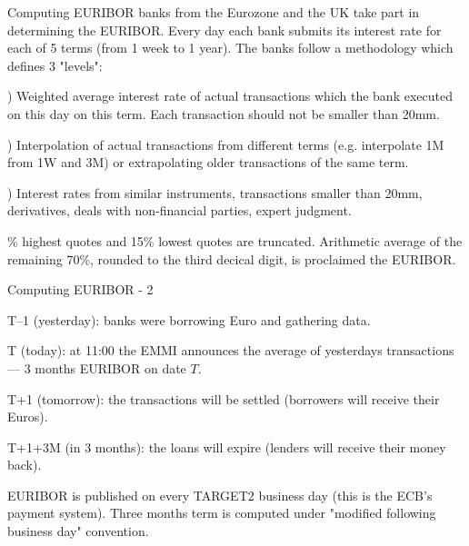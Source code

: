 \documentclass{beamer}
\begin{document}
\begin{frame}{Computing EURIBOR}
 banks from the Eurozone and the UK take part in determining the EURIBOR. Every day each bank submits its interest rate for each of 5 terms (from 1 week to 1 year). The banks follow a methodology which defines 3 "levels":

) Weighted average interest rate of actual transactions which the bank executed on this day on this term. Each transaction should not be smaller than 20mm.

) Interpolation of actual transactions from different terms (e.g. interpolate 1M from 1W and 3M) or extrapolating older transactions of the same term.

) Interest rates from similar instruments, transactions smaller than 20mm, derivatives, deals with non-financial parties, expert judgment. 

\% highest quotes and 15\% lowest quotes are truncated. Arithmetic average of the remaining 70\%, rounded to the third decical digit, is proclaimed the EURIBOR.
\end{frame}



\begin{frame}{Computing EURIBOR - 2}
\centering
{}
	
\justify
T--1 (yesterday):  banks were borrowing Euro and gathering data.

T (today): at 11:00 the EMMI announces the average of yesterdays transactions --- 3 months EURIBOR on date $T$.

T+1 (tomorrow): the transactions will be settled (borrowers will receive their Euros).

T+1+3M (in 3 months): the loans will expire (lenders will receive their money back).

\justify
EURIBOR is published on every TARGET2 business day (this is the ECB's payment system). Three months term is computed under "modified following business day" convention.
\end{frame}
\end{document}
